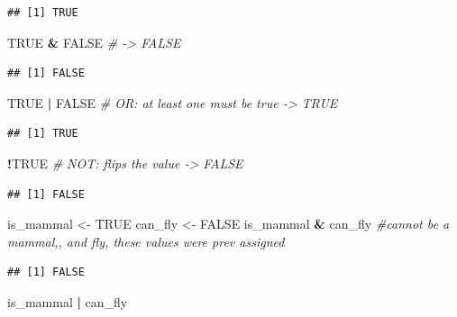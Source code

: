 \documentclass[
]{article}
\newenvironment{Shaded}{\begin{snugshade}}{\end{snugshade}}
\newcommand{\CommentTok}[1]{\textcolor[rgb]{0.56,0.35,0.01}{\textit{#1}}}
\newcommand{\ConstantTok}[1]{\textcolor[rgb]{0.56,0.35,0.01}{#1}}
\newcommand{\NormalTok}[1]{#1}
\newcommand{\OtherTok}[1]{\textcolor[rgb]{0.56,0.35,0.01}{#1}}
\newcommand{\SpecialCharTok}[1]{\textcolor[rgb]{0.81,0.36,0.00}{\textbf{#1}}}
\begin{document}
\begin{verbatim}
## [1] TRUE
\end{verbatim}

\begin{Shaded}
\begin{Highlighting}[]
\ConstantTok{TRUE} \SpecialCharTok{\&} \ConstantTok{FALSE}  \CommentTok{\# {-}\textgreater{} FALSE}
\end{Highlighting}
\end{Shaded}

\begin{verbatim}
## [1] FALSE
\end{verbatim}

\begin{Shaded}
\begin{Highlighting}[]
\ConstantTok{TRUE} \SpecialCharTok{|} \ConstantTok{FALSE}  \CommentTok{\# OR: at least one must be true {-}\textgreater{} TRUE}
\end{Highlighting}
\end{Shaded}

\begin{verbatim}
## [1] TRUE
\end{verbatim}

\begin{Shaded}
\begin{Highlighting}[]
\SpecialCharTok{!}\ConstantTok{TRUE}         \CommentTok{\# NOT: flips the value {-}\textgreater{} FALSE}
\end{Highlighting}
\end{Shaded}

\begin{verbatim}
## [1] FALSE
\end{verbatim}

\begin{Shaded}
\begin{Highlighting}[]
\NormalTok{is\_mammal }\OtherTok{\textless{}{-}} \ConstantTok{TRUE}
\NormalTok{can\_fly }\OtherTok{\textless{}{-}} \ConstantTok{FALSE}
\NormalTok{is\_mammal }\SpecialCharTok{\&}\NormalTok{ can\_fly }\CommentTok{\#cannot be a mammal,, and fly, these values were prev assigned }
\end{Highlighting}
\end{Shaded}

\begin{verbatim}
## [1] FALSE
\end{verbatim}

\begin{Shaded}
\begin{Highlighting}[]
\NormalTok{is\_mammal }\SpecialCharTok{|}\NormalTok{ can\_fly}
\end{Highlighting}
\end{Shaded}
\end{document}
